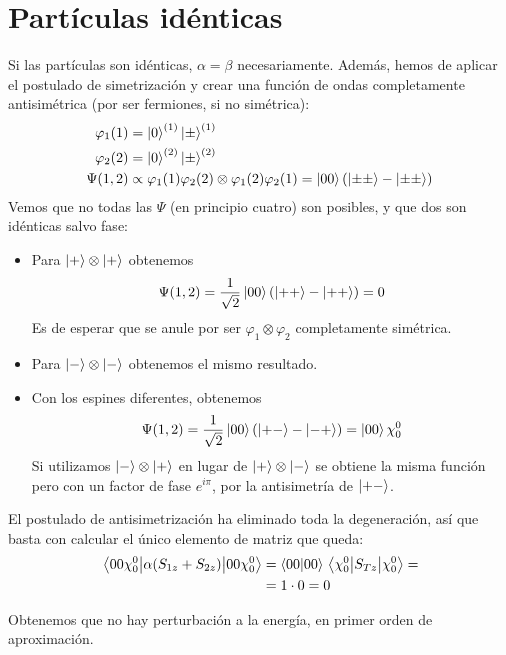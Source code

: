 \section*{Partículas idénticas}
Si las partículas son idénticas, $\alpha=\beta$ necesariamente.
Además, hemos de aplicar el postulado de simetrización y crear una
función de ondas completamente antisimétrica (por ser fermiones, si no
simétrica):
\begin{align}
  \varphi_1(1) &=\ket{0}^{(1)}\ket{\pm}^{(1)}\\
  \varphi_2(2) &=\ket{0}^{(2)}\ket{\pm}^{(2)}\\
  \Psi(1,2) &\propto \varphi_1(1)\varphi_2(2) \otimes
              \varphi_1(2)\varphi_2(1) = \ket{00}(\ket{\pm\pm}-\ket{\pm\pm})
\end{align}
Vemos que no todas las $\Psi$ (en principio cuatro) son posibles, y
que dos son idénticas salvo fase:
\begin{itemize}
  \item Para $\ket{+}\otimes\ket{+}$ obtenemos
    \begin{equation}
      \Psi(1,2) = \frac{1}{\sqrt{2}}\ket{00}(\ket{++}-\ket{++}) = 0 
    \end{equation}
    Es de esperar que se anule por ser $\varphi_1\otimes\varphi_2$
    completamente simétrica.
  \item Para $\ket{-}\otimes\ket{-}$ obtenemos el mismo resultado.
  \item Con los espines diferentes, obtenemos
    \begin{equation}
      \Psi(1,2) = \frac{1}{\sqrt{2}}\ket{00}(\ket{+-}-\ket{-+})  = \ket{00}\chi_0^0
    \end{equation}
    Si utilizamos $\ket{-}\otimes\ket{+}$ en lugar de
    $\ket{+}\otimes\ket{-}$ se obtiene la misma función pero con un
    factor de fase $e^{i\pi}$, por la antisimetría de $\ket{+-}$.
\end{itemize}

El postulado de antisimetrización ha eliminado toda la degeneración,
así que basta con calcular el único elemento de matriz que queda:
\begin{equation}
  \begin{split}
    \ev{\alpha(S_{1z}+S_{2z})}{00\chi_0^0} &=
    \braket{00}{00}\ev{S_{Tz}}{\chi_0^0} = \\ &= 1\cdot0 = 0
  \end{split}
\end{equation}

Obtenemos que no hay perturbación a la energía, en primer orden de aproximación.

